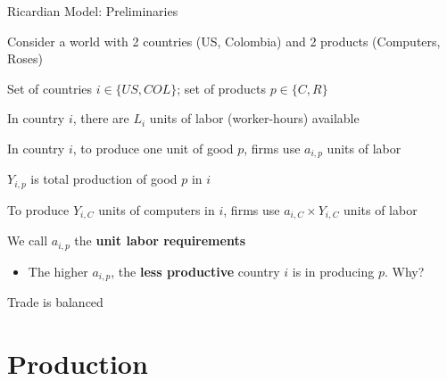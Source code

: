 \documentclass[notes,11pt, aspectratio=169, xcolor=table]{beamer}
\newenvironment{wideitemize}{\itemize\addtolength{\itemsep}{10pt}}{\enditemize}
\begin{document}
\begin{frame}{Ricardian Model: Preliminaries}
\begin{wideitemize}
        \item Consider a world with 2 countries (US, Colombia) and 2 products (Computers, Roses)
        \item<2-> Set of countries $i \in \{ US, COL\}$; set of products $p \in \{ C, R\}$
        \item<3-> In country $i$, there are $L_i$ units of labor (worker-hours) available 
        \item<4-> In country $i$, to produce one unit of good $p$, firms use $a_{i,p}$ units of labor
        \item<5-> $Y_{i,p}$ is total production of good $p$ in $i$
        \item<6-> To produce $Y_{i,C}$ units of computers in $i$, firms use $a_{i,C} \times Y_{i,C}$ units of labor 
        \item<6-> We call $a_{i,p}$ the \textbf{unit labor requirements}
        \begin{itemize}
            \item<6-> The higher $a_{i,p}$, the \textbf{less productive} country $i$ is in producing $p$. Why?
        \end{itemize}
        \item<7-> Trade is balanced
    \end{wideitemize}
\end{frame}

\section{Production}
\end{document}
